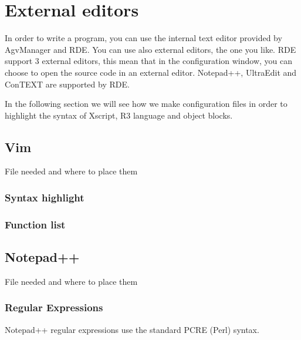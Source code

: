 

\chapter{External editors}
In order to write a program, you can use the internal text editor provided by AgvManager and RDE. You can use also external editors, the one you like. RDE support 3 external editors, this mean that in the configuration window, you can choose to open the source code in an external editor. Notepad++, UltraEdit and ConTEXT are supported by RDE.

In the following section we will see how we make configuration files in order to highlight the syntax of Xscript, R3 language and object blocks.

\section{Vim}
File needed and where to place them

\subsection{Syntax highlight}

\subsection{Function list}

\section{Notepad++}
File needed and where to place them

\subsection{Regular Expressions}
Notepad++ regular expressions use the standard PCRE (Perl) syntax.

